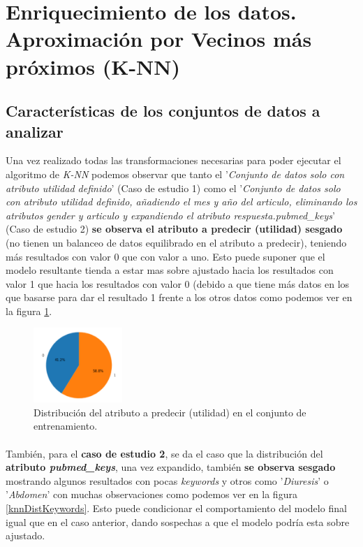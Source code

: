 \section{Enriquecimiento de los datos. Aproximación por Vecinos más próximos (K-NN)}
\label{resultados:knn}

\subsection{Características de los conjuntos de datos a analizar}
\label{resultados:knn_caracteristicas}
Una vez realizado todas las transformaciones necesarias para poder ejecutar el algoritmo de \textit{K-NN} podemos observar que tanto el '\textit{Conjunto de datos solo con atributo utilidad definido}' (Caso de estudio 1) como el '\textit{Conjunto de datos solo con atributo utilidad definido, añadiendo el mes y año del articulo, eliminando los atributos gender y articulo y expandiendo el atributo respuesta.pubmed\_keys}' (Caso de estudio 2) \textbf{se observa el atributo a predecir (utilidad) sesgado} (no tienen un balanceo de datos equilibrado en el atributo a predecir), teniendo más resultados con valor 0 que con valor a uno. Esto puede suponer que el modelo resultante tienda a estar mas sobre ajustado hacia los resultados con valor 1 que hacia los resultados con valor 0 (debido a que tiene más datos en los que basarse para dar el resultado 1 frente a los otros datos como podemos ver en la figura \ref{knnDistUtilidad}.

\begin{figure}[!htb]
  \centering
    \includegraphics[width=0.3\textwidth]{images/resultados_knn_conjunto1.png}
    \caption{Distribución del atributo a predecir (utilidad) en el conjunto de entrenamiento.}
  \label{knnDistUtilidad}
\end{figure}

\paragraph{}
También, para el \textbf{caso de estudio 2}, se da el caso que la distribución del \textbf{atributo \textit{pubmed\_keys}}, una vez expandido, también \textbf{se observa sesgado} mostrando algunos resultados con pocas \textit{keywords} y otros como '\textit{Diuresis}' o '\textit{Abdomen}' con muchas observaciones como podemos ver en la figura \ref{knnDistKeywords}. Esto puede condicionar el comportamiento del modelo final igual que en el caso anterior, dando sospechas a que el modelo podría esta sobre ajustado\cite{ref:knn_overfiting}.

